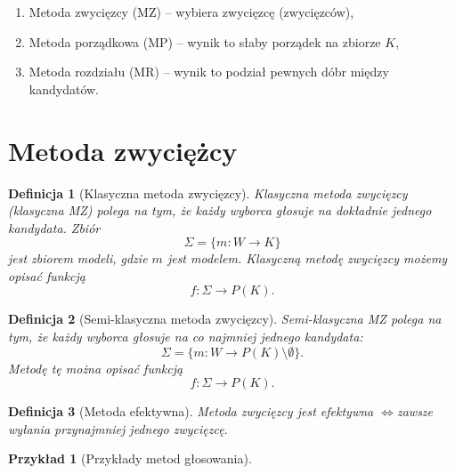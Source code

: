 \documentclass[12pt,a4paper]{article}
\theoremstyle{break}
\newtheorem{definition}{Definicja}[section]
\newtheorem{example}{Przykład}[section]
\newcommand{\witw}{$\Leftrightarrow$}
\begin{document}
\begin{enumerate}[1)]
	\item Metoda zwycięzcy (MZ) – wybiera zwycięzcę (zwycięzców),
	\item Metoda porządkowa (MP) – wynik to słaby porządek na zbiorze $K$,
	\item Metoda rozdziału (MR) – wynik to podział pewnych dóbr między kandydatów.
\end{enumerate}

\newpage

\section{Metoda zwyciężcy}
\begin{definition}[Klasyczna metoda zwycięzcy]
	Klasyczna metoda zwycięzcy (klasyczna MZ) polega na tym, że każdy wyborca głosuje na dokładnie jednego kandydata. Zbiór
	$$\Sigma = \{m:W\rightarrow K\}$$
	jest zbiorem modeli, gdzie $m$ jest modelem. Klasyczną metodę zwycięzcy możemy opisać funkcją
	$$f: \Sigma \rightarrow P(K).$$
\end{definition}

\begin{definition}[Semi-klasyczna metoda zwycięzcy]
	Semi-klasyczna MZ polega na tym, że każdy wyborca głosuje na co najmniej jednego kandydata:
	$$\Sigma = \{m:W\rightarrow P(K)\setminus \emptyset\}.$$
	Metodę tę można opisać funkcją
	$$f: \Sigma \rightarrow P(K).$$
\end{definition}

\begin{definition}[Metoda efektywna]
	Metoda zwycięzcy jest efektywna \witw zawsze wyłania przynajmniej jednego zwycięzcę.
\end{definition}

\begin{example}[Przykłady metod głosowania]
\end{example}
\end{document}
